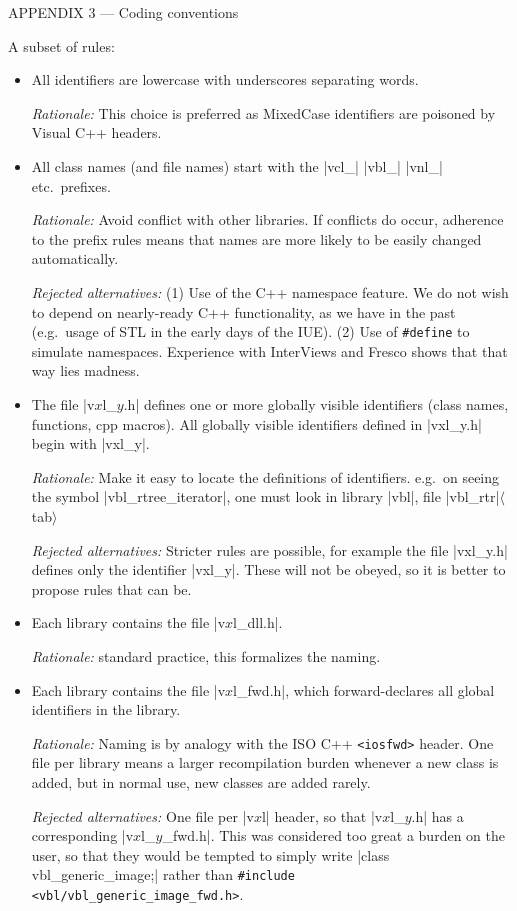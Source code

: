 \documentclass[11pt]{article}
\begin{document}
\vskip1cm

APPENDIX 3 --- Coding conventions

\def\vxl{|v$x$l}
A subset of rules:
\begin{itemize}
\item All identifiers are lowercase with underscores separating words.

{\em Rationale:}
This choice is preferred as MixedCase identifiers are poisoned by Visual
C++ headers.


\item All class names (and file names) start with the
|vcl_| |vbl_| |vnl_| etc.~prefixes.

{\em Rationale:} Avoid conflict with other libraries.  If conflicts do
occur, adherence to the prefix rules means that names are more likely to be
easily changed automatically.

{\em Rejected alternatives:} (1) Use of the C++ namespace feature.  We do
not wish to depend on nearly-ready C++ functionality, as we have in the
past (e.g.\ usage of STL in the early days of the IUE).  (2) Use of
\verb|#define| to simulate namespaces.  Experience with InterViews and
Fresco shows that that way lies madness.


\item The file \vxl_$y$.h| defines one or more globally visible identifiers
(class names, functions, cpp macros).
All globally visible identifiers defined in |vxl_y.h| begin with |vxl_y|.

{\em Rationale:} Make it easy to locate the definitions of
identifiers. e.g.\ on seeing the symbol |vbl_rtree_iterator|, one must look
in library |vbl|, file |vbl_rtr|$\langle${\sc tab}$\rangle$

{\em Rejected alternatives:}
Stricter rules are possible, for example the file |vxl_y.h| defines only the
identifier |vxl_y|.  These will not be obeyed, so it is better to propose
rules that can be.


\item Each library contains the file \vxl_dll.h|.

{\em Rationale:} standard practice, this formalizes the naming.


\item Each library contains the file \vxl_fwd.h|, which forward-declares
all global identifiers in the library.

{\em Rationale:} Naming is by analogy with the ISO C++ \verb|<iosfwd>|
header.  One file per library means a larger recompilation burden whenever
a new class is added, but in normal use, new classes are added rarely.

{\em Rejected alternatives:} One file per \vxl| header, so that \vxl_$y$.h|
has a corresponding \vxl_$y$_fwd.h|.  This was considered too great a
burden on the user, so that they would be tempted to simply write |class
vbl_generic_image;| rather than \verb|#include <vbl/vbl_generic_image_fwd.h>|.


\end{itemize}
\end{document}
